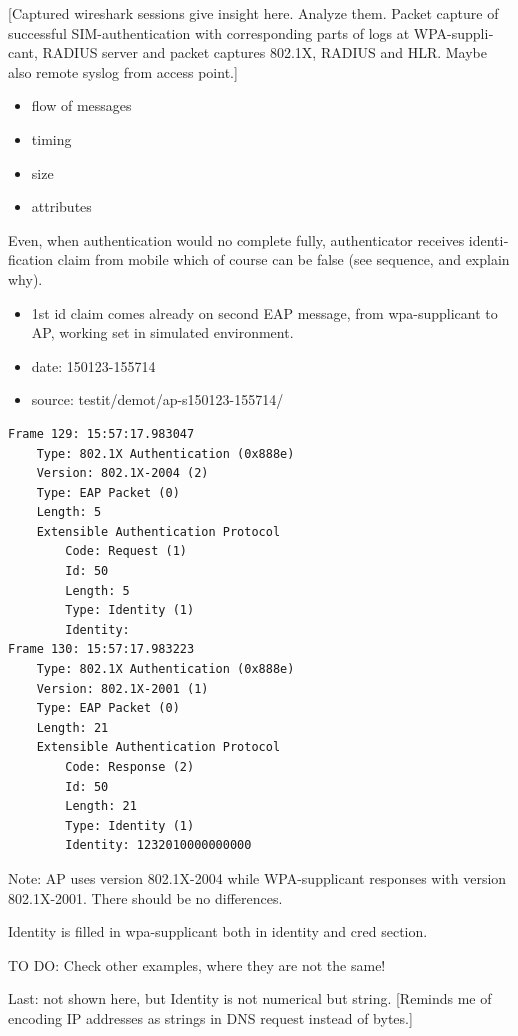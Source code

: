 \documentclass[12pt,a4paper,english]{tutthesis}
\begin{document}
\begin{otherlanguage}{english}
[Captured wireshark sessions give insight here. Analyze them.
Packet capture of successful SIM-authentication with corresponding
parts of logs at WPA-supplicant, RADIUS server and packet captures 
802.1X, RADIUS and HLR. Maybe also remote syslog from access point.]

\begin{itemize}
\item flow of messages
\item timing
\item size
\item attributes
\end{itemize}

Even, when authentication would no complete fully, authenticator
receives identification claim from mobile which of course can 
be false (see sequence, and explain why).

\begin{itemize}
\item 1st id claim comes already on second EAP message, from
wpa-supplicant to AP, working set in simulated environment.
\item date: 150123-155714
\item source: testit/demot/ap-s150123-155714/
\end{itemize}
\begin{verbatim}
Frame 129: 15:57:17.983047
    Type: 802.1X Authentication (0x888e)
    Version: 802.1X-2004 (2)
    Type: EAP Packet (0)
    Length: 5
    Extensible Authentication Protocol
        Code: Request (1)
        Id: 50
        Length: 5
        Type: Identity (1)
        Identity: 
Frame 130: 15:57:17.983223
    Type: 802.1X Authentication (0x888e)
    Version: 802.1X-2001 (1)
    Type: EAP Packet (0)
    Length: 21
    Extensible Authentication Protocol
        Code: Response (2)
        Id: 50
        Length: 21
        Type: Identity (1)
        Identity: 1232010000000000
\end{verbatim}

Note: AP uses version 802.1X-2004 while WPA-supplicant responses with
version 802.1X-2001. There should be no differences.

Identity is filled in wpa-supplicant both
in identity and cred section.

TO DO: Check other examples, where  they are not the same!

Last: not shown here, but Identity is not numerical but string.
[Reminds me of encoding IP addresses as strings in DNS request instead of bytes.]


\end{otherlanguage}
\end{document}
